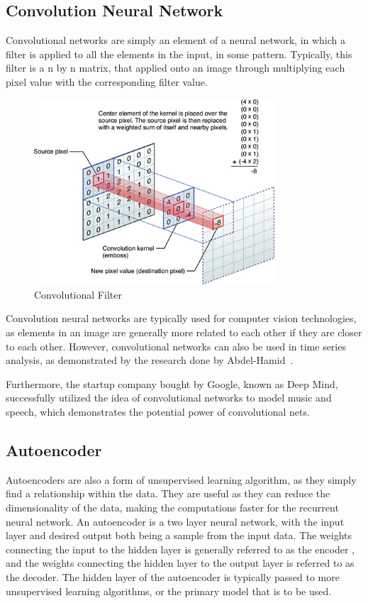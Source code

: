 \documentclass{article}
\begin{document}
\subsection{Convolution Neural Network}
Convolutional networks are simply an element of a neural network, in which a
filter is applied to all the elements in the input, in some pattern. Typically,
this filter is a n by n matrix, that applied onto an image through multiplying
each pixel value with the corresponding filter value. 
\begin{figure}[H]
	\centering
	\caption{Convolutional Filter}
	\includegraphics[width=0.8\textwidth]{convolutionFilter.jpg}
\end{figure}
Convolution neural networks are typically used for computer vision technologies,
as elements in an image are generally more related to each other if they are
closer to each other. However, convolutional networks can also be used in time
series analysis, as demonstrated by the research done by
Abdel-Hamid~\cite{convrnn}.

Furthermore, the startup company bought by Google, known as Deep Mind,
successfully utilized the idea of convolutional networks to model music and
speech, which demonstrates the potential power of convolutional nets.


\subsection{Autoencoder}
Autoencoders are also a form of unsupervised learning algorithm, as they simply
find a relationship within the data. They are useful as they can reduce the
dimensionality of the data, making the computations faster for the recurrent
neural network. An autoencoder is a two layer neural network, with the input
layer and desired output both being a sample from the input data. The weights
connecting the input to the hidden layer is generally referred to as the encoder
, and the weights connecting the hidden layer to the output layer is referred to
as the decoder. The hidden layer of the autoencoder is typically passed to more
unsupervised learning algorithms, or the primary model that is to be used.
\end{document}
